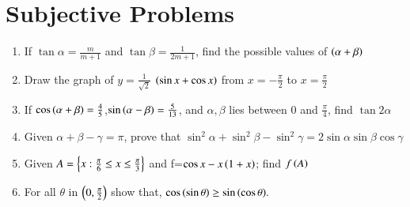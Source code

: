 \documentclass[journal,12pt,onecolumn]{IEEEtran}
\theoremstyle{remark}
\begin{document}
\section{Subjective Problems}
\begin{enumerate}
\item If $\tan{\alpha}=\frac{m}{m+1}$ and $\tan{\beta}=\frac{1}{2m+1}$, find the possible values of $\left(\alpha+\beta\right)$ \hfill{}
    \item Draw the graph of $y=\frac{1}{\sqrt{2}}$ $\left(\sin {x}+\cos {x}\right)$ from $x=-\frac{\pi}{2}$ to $x=\frac{\pi}{2}$
    \item If $\cos{\ensuremath{\left(\alpha+\beta\right)}}=\frac{4}{5}$,$\sin{\ensuremath{\left(\alpha-\beta\right)}}=\frac{5}{13}$, and $\alpha,\beta$ lies between $0$ and $\frac{\pi}{4}$, find $\tan{2\alpha}$ \hfill{}
\item Given $\alpha+\beta-\gamma=\pi$, prove that $\sin^2{\alpha}+\sin^2{\beta}-\sin^2{\gamma}=2\sin{\alpha}\sin{\beta}\cos{\gamma}$ \hfill{}
\item Given $A=\left\{x:\frac{\pi}{6}\le x\le\frac{\pi}{3}\right\}$ and f=$\cos{x-x\ensuremath{\left(1+x\right)}}$; find $f\left(A\right)$ \hfill{}

\item For all $\theta$ in $\left(0, \frac{\pi}{2}\right)$ show that, $\cos\left(\sin\theta\right)\geq
\sin{\ensuremath{\left(\cos{\theta}\right)}}.$ \hfill{}
\end{enumerate}
\end{document}
